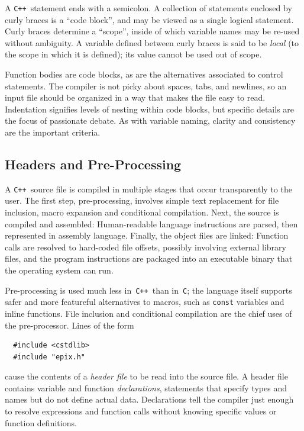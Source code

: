 \documentclass[12pt]{report}
\newcommand{\code}[1]{\texttt{#1}}
\newcommand{\CXX}{\code{C++}}
\begin{document}
A \CXX\ statement ends with a semicolon. A collection of statements
enclosed by curly braces is a ``code block'', and may be viewed as a
single logical statement. Curly braces determine a ``scope'', inside
of which variable names may be re-used without ambiguity. A variable
defined between curly braces is said to be \emph{local} (to the scope
in which it is defined); its value cannot be used out of scope.

Function bodies are code blocks, as are the alternatives associated to
control statements. The compiler is not picky about spaces, tabs, and
newlines, so an input file should be organized in a way that makes the
file easy to read. Indentation signifies levels of nesting within code
blocks, but specific details are the focus of passionate debate. As
with variable naming, clarity and consistency are the important
criteria.


\subsection*{Headers and Pre-Processing}

A \CXX\ source file is compiled in multiple stages that occur
transparently to the user. The first step, pre-processing, involves
simple text replacement for file inclusion, macro expansion and
conditional compilation. Next, the source is compiled and assembled:
Human-readable language instructions are parsed, then represented in
assembly language. Finally, the object files are linked: Function
calls are resolved to hard-coded file offsets, possibly involving
external library files, and the program instructions are packaged into
an executable binary that the operating system can run.

Pre-processing is used much less in~\CXX\ than in~\code{C}; the
language itself supports safer and more featureful alternatives to
macros, such as \code{const} variables and inline functions. File
inclusion and conditional compilation are the chief uses of the
pre-processor. Lines of the form 
\begin{verbatim}
  #include <cstdlib>
  #include "epix.h"
\end{verbatim}
cause the contents of a \emph{header file} to be read into the source
file. A header file contains variable and function
\emph{declarations}, statements that specify types and names but do
not define actual data. Declarations tell the compiler just enough
to resolve expressions and function calls without knowing specific
values or function definitions. 
\end{document}
